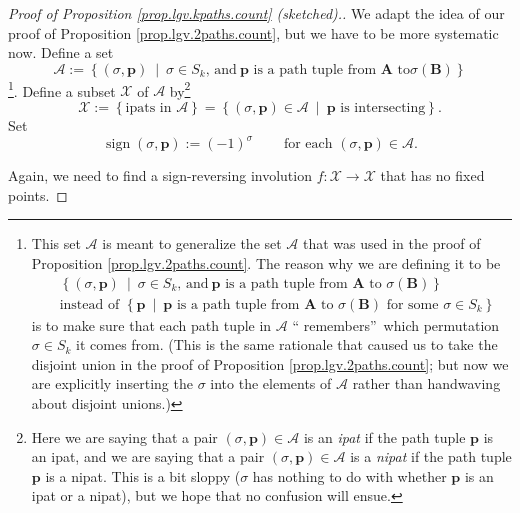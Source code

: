 \begin{definition}
\begin{proof}
[Proof of Proposition \ref{prop.lgv.kpaths.count} (sketched).]We adapt the
idea of our proof of Proposition \ref{prop.lgv.2paths.count}, but we have to
be more systematic now. Define a set%
\[
\mathcal{A}:=\left\{  \left(  \sigma,\mathbf{p}\right)  \ \mid\ \sigma\in
S_{k}\text{, and}\ \mathbf{p}\text{ is a path tuple from }\mathbf{A}\text{ to
}\sigma\left(  \mathbf{B}\right)  \right\}
\]
\footnote{This set $\mathcal{A}$ is meant to generalize the set $\mathcal{A}$
that was used in the proof of Proposition \ref{prop.lgv.2paths.count}. The
reason why we are defining it to be
\begin{align*}
&  \left\{  \left(  \sigma,\mathbf{p}\right)  \ \mid\ \sigma\in S_{k}\text{,
and}\ \mathbf{p}\text{ is a path tuple from }\mathbf{A}\text{ to }%
\sigma\left(  \mathbf{B}\right)  \right\} \\
&  \text{instead of }\left\{  \mathbf{p}\ \mid\ \mathbf{p}\text{ is a path
tuple from }\mathbf{A}\text{ to }\sigma\left(  \mathbf{B}\right)  \text{ for
some }\sigma\in S_{k}\right\}
\end{align*}
is to make sure that each path tuple in $\mathcal{A}$ \textquotedblleft
remembers\textquotedblright\ which permutation $\sigma\in S_{k}$ it comes
from. (This is the same rationale that caused us to take the disjoint union in
the proof of Proposition \ref{prop.lgv.2paths.count}; but now we are
explicitly inserting the $\sigma$ into the elements of $\mathcal{A}$ rather
than handwaving about disjoint unions.)}. Define a subset $\mathcal{X}$ of
$\mathcal{A}$ by\footnote{Here we are saying that a pair $\left(
\sigma,\mathbf{p}\right)  \in\mathcal{A}$ is an \emph{ipat} if the path tuple
$\mathbf{p}$ is an ipat, and we are saying that a pair $\left(  \sigma
,\mathbf{p}\right)  \in\mathcal{A}$ is a \emph{nipat} if the path tuple
$\mathbf{p}$ is a nipat. This is a bit sloppy ($\sigma$ has nothing to do with
whether $\mathbf{p}$ is an ipat or a nipat), but we hope that no confusion
will ensue.}%
\[
\mathcal{X}:=\left\{  \text{ipats in }\mathcal{A}\right\}  =\left\{  \left(
\sigma,\mathbf{p}\right)  \in\mathcal{A}\ \mid\ \mathbf{p}\text{ is
intersecting}\right\}  .
\]
Set%
\[
\operatorname*{sign}\left(  \sigma,\mathbf{p}\right)  :=\left(  -1\right)
^{\sigma}\ \ \ \ \ \ \ \ \ \ \text{for each }\left(  \sigma,\mathbf{p}\right)
\in\mathcal{A}.
\]


Again, we need to find a sign-reversing involution $f:\mathcal{X}%
\rightarrow\mathcal{X}$ that has no fixed points.


\end{proof}
\end{definition}
